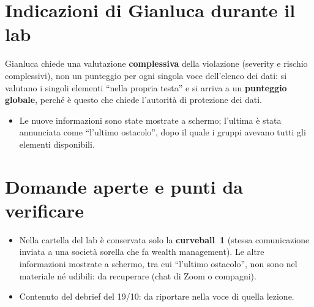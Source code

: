 \section{Indicazioni di Gianluca durante il lab}
\begin{esame}
Gianluca chiede una valutazione \textbf{complessiva} della violazione (severity e rischio
complessivi), non un punteggio per ogni singola voce dell'elenco dei dati: si valutano i singoli
elementi ``nella propria testa'' e si arriva a un \textbf{punteggio globale}, perché è questo che
chiede l'autorità di protezione dei dati.
\end{esame}
\begin{itemize}
  \item Le nuove informazioni sono state mostrate a schermo; l'ultima è stata annunciata come
    ``l'ultimo ostacolo'', dopo il quale i gruppi avevano tutti gli elementi disponibili.
\end{itemize}

\section{Domande aperte e punti da verificare}
\begin{verifica}
\begin{itemize}
  \item Nella cartella del lab è conservata solo la \textbf{curveball~1} (stessa comunicazione inviata
    a una società sorella che fa wealth management). Le altre informazioni mostrate a schermo, tra cui
    ``l'ultimo ostacolo'', non sono nel materiale né udibili: da recuperare (chat di Zoom o compagni).
  \item Contenuto del debrief del 19/10: da riportare nella voce di quella lezione.
\end{itemize}
\end{verifica}
